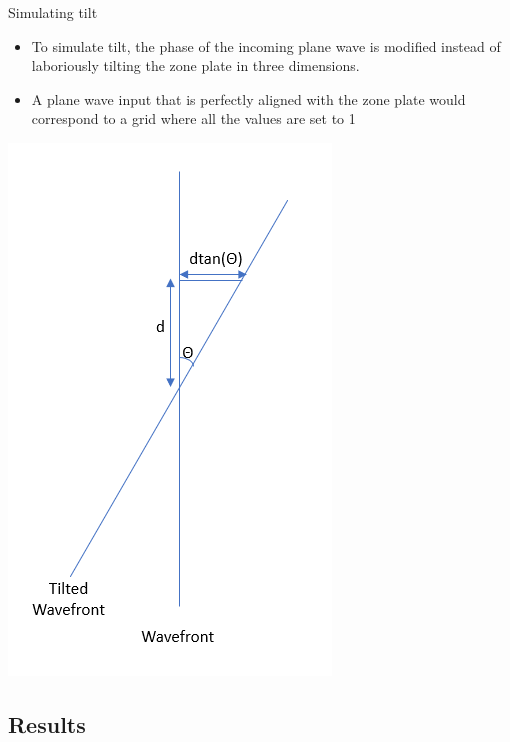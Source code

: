 \documentclass{beamer}
\begin{document}
\begin{frame}{Simulating tilt}
\begin{itemize}
\item To simulate tilt, the phase of the incoming plane wave is modified instead of
laboriously tilting the zone plate in three dimensions.
\item A plane wave input that is perfectly aligned with the zone plate would correspond to a grid where all the values are set to 1
\end{itemize}
\begin{center}
	\includegraphics[scale=0.3]{tilt}
\end{center}
\end{frame}


\subsection{Results}
\end{document}
